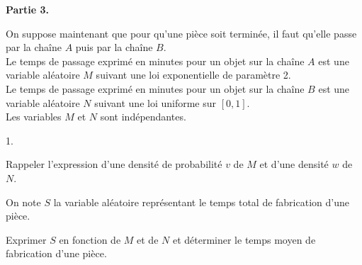 \documentclass[11pt]{article}%
\begin{document}
\noindent \textbf{Partie 3.}

\noindent On suppose maintenant que pour qu'une pièce soit terminée, il
faut
qu'elle passe par la chaîne $A$ puis par la chaîne $B$.\\
Le temps de passage exprimé en minutes pour un objet sur la chaîne $A$
est
une variable aléatoire $M$ suivant une loi exponentielle de paramètre
2.
\\
Le temps de passage exprimé en minutes pour un objet sur la chaîne $B$
est
une variable aléatoire $N$ suivant une loi uniforme sur $\left[
0,1\right] $.
\\
Les variables $M$ et $N$ sont indépendantes.

\begin{noliste}{1.}
 \setlength{\itemsep}{4mm}
\item Rappeler l'expression d'une densité de probabilité $v$ de $M$ et
d'une
densité $w$ de $N$.

\item On note $S$ la variable aléatoire représentant le temps total de
fabrication d'une pièce.

Exprimer $S$ en fonction de $M$ et de $N$ et déterminer le temps moyen
de
fabrication d'une pièce.
\end{noliste}

\label{fin}
\end{document}
